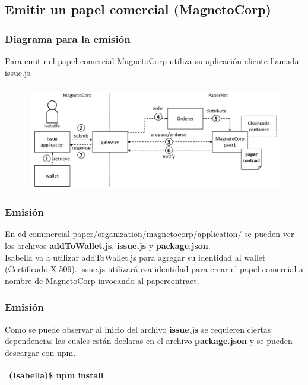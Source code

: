\documentclass{beamer}
\begin{document}
	\subsection{Emitir un papel comercial (MagnetoCorp)}
	
	\begin{frame}
		\frametitle{Diagrama para la emisión}
		Para emitir el papel comercial MagnetoCorp utiliza su aplicación cliente llamada issue.js.
		\begin{figure}[h]
			\includegraphics[scale=.4]{papernet_03}
			\centering
		\end{figure}
	\end{frame}
	
	\begin{frame}
		\frametitle{Emisión}
		En cd commercial-paper/organization/magnetocorp/application/ se pueden ver los archivos \textbf{addToWallet.js}, \textbf{issue.js} y \textbf{package.json}.\\
		\vspace{4mm}
		Isabella va a utilizar addToWallet.js para agregar su identidad al wallet (Certificado X.509). issue.js utilizará esa identidad para crear el papel comercial a nombre de MagnetoCorp invocando al papercontract.
	\end{frame}
	
	\begin{frame}
		\frametitle{Emisión}
		Como se puede observar al inicio del archivo \textbf{issue.js} se requieren ciertas dependencias las cuales están declaras en el archivo \textbf{package.json} y se pueden descargar con npm.\\
		\begin{center}
			\begin{tabulary}{\linewidth}{L}
				\hline
				(Isabella)\$ npm install \\
				\hline
			\end{tabulary} 
		\end{center}
	\end{frame}
	
\end{document}

